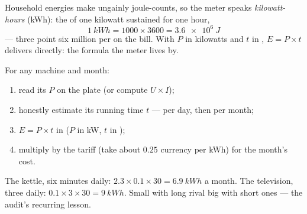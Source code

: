 \begin{definition}\label{def:g9:electric-power-energy:kwh}
Household energies make ungainly joule-counts, so the meter
speaks \emph{kilowatt-hours}
(\unit{kWh}): the  of one kilowatt sustained for one
hour,
\[
\qty{1}{kWh} = 1000 \times 3600 = \qty{3.6e6}{J}
\]
--- three point six million  per  on the bill.
With $P$ in kilowatts and $t$ in , $E = P \times t$
delivers  directly: the formula the meter
lives by.
\end{definition}

\begin{method}\label{met:g9:electric-power-energy:audit}
For any machine and month:
\begin{enumerate}
  \item read its  $P$ on the plate (or compute
        $U \times I$);
  \item honestly estimate its running time $t$ --- per day,
        then per month;
  \item $E = P \times t$ in  ($P$ in
        \unit{kW}, $t$ in );
  \item multiply by the tariff (take about $0.25$ currency
         per \unit{kWh}) for the month's cost.
\end{enumerate}
The kettle, six minutes daily: $2.3 \times 0.1 \times 30 =
\qty{6.9}{kWh}$ a month. The television, three  daily:
$0.1 \times 3 \times 30 = \qty{9}{kWh}$. Small  with
long  rival big  with short ones --- the audit's
recurring lesson.
\end{method}

